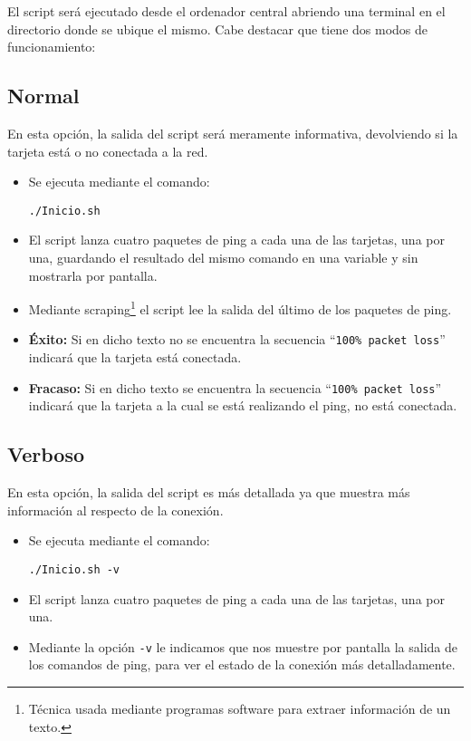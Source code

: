 \documentclass[12pt,letterpaper]{article}
\begin{document}
El script será ejecutado desde el ordenador central abriendo una terminal en el directorio donde se ubique el mismo. Cabe destacar que tiene dos modos de funcionamiento:

\subsection{Normal}
En esta opción, la salida del script será meramente informativa, devolviendo si la tarjeta está o no conectada a la red.
\begin{itemize}
	\item Se ejecuta mediante el comando:
	\begin{center}
		\texttt{./Inicio.sh}
	\end{center}
	\item El script lanza cuatro paquetes de ping a cada una de las tarjetas, una por una, guardando el resultado del mismo comando en una variable y sin mostrarla por pantalla.
	\item Mediante scraping\footnote{Técnica usada mediante programas software para extraer información de un texto.} el script lee la salida del último de los paquetes de ping.
	\item \textbf{Éxito:} Si en dicho texto no se encuentra la secuencia ``\texttt{100\% packet loss}'' indicará que la tarjeta está conectada.
	\item \textbf{Fracaso:} Si en dicho texto se encuentra la secuencia ``\texttt{100\% packet loss}'' indicará que la tarjeta a la cual se está realizando el ping, no está conectada.
\end{itemize}

\subsection{Verboso}
En esta opción, la salida del script es más detallada ya que muestra más información al respecto de la conexión.

\begin{itemize}
	\item Se ejecuta mediante el comando:
	\begin{center}
		\texttt{./Inicio.sh -v}
	\end{center}
	\item El script lanza cuatro paquetes de ping a cada una de las tarjetas, una por una.
	\item Mediante la opción \texttt{-v} le indicamos que nos muestre por pantalla la salida de los comandos de ping, para ver el estado de la conexión más detalladamente.
\end{itemize}
\end{document}
